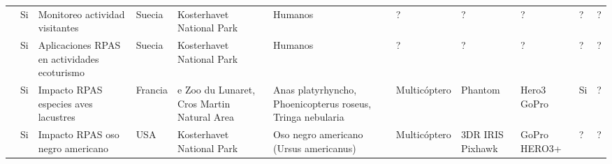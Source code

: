 \begin{landscape}
\begin{longtabu}{p{1cm}p{1cm}p{3cm}p{2cm}p{3cm}p{3cm}p{1cm}p{2cm}p{3cm}p{1cm}p{2cm}}
\cite{hansen_applying_2016} & Si  & Monitoreo actividad visitantes  & Suecia & Kosterhavet National Park &  Humanos  & ?  & ? & ?  & ? & ?  \\ 

\cite{king_will_2014} & Si  & Aplicaciones RPAS en actividades ecoturismo & Suecia & Kosterhavet National Park &  Humanos  & ?  & ? & ?  & ? & ?  \\ 
  
\cite{vas_approaching_2015} & Si  & Impacto RPAS  especies aves lacustres  & Francia & e Zoo du Lunaret, Cros Martin Natural Area &  Anas platyrhyncho, Phoenicopterus roseus, Tringa nebularia  & Multicóptero &  Phantom & Hero3 GoPro & Si  & ?  \\ 

\cite{ditmer_bears_2015} & Si  & Impacto  RPAS oso negro americano   & USA & Kosterhavet National Park &  Oso negro americano (Ursus americanus) & Multicóptero & 3DR IRIS Pixhawk & GoPro HERO3+ & ?  & ?  \\ 

\hline


\end{longtabu}
\end{landscape}

